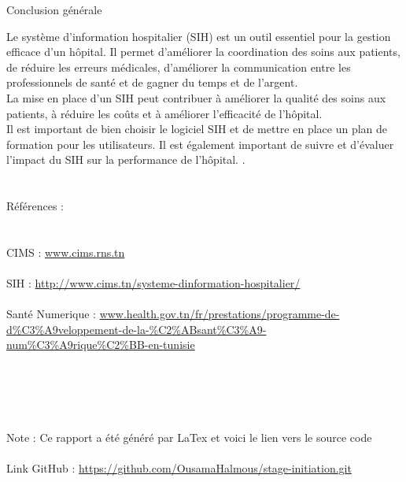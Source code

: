 \documentclass[12pt]{rapportINPTCLOUD}
\begin{document}
\begin{center}
	\Huge{Conclusion générale}
\end{center}
\large {
Le système d'information hospitalier (SIH) est un outil essentiel pour la gestion efficace d'un hôpital. Il permet d'améliorer la coordination des soins aux patients, de réduire les erreurs médicales, d'améliorer la communication entre les professionnels de santé et de gagner du temps et de l'argent.\\

La mise en place d'un SIH peut contribuer à améliorer la qualité des soins aux patients, à réduire les coûts et à améliorer l'efficacité de l'hôpital.\\

 Il est important de bien choisir le logiciel SIH et de mettre en place un plan de formation pour les utilisateurs. Il est également important de suivre et d'évaluer l'impact du SIH sur la performance de l'hôpital.}
\newpage
.\\ \\ \\
\huge{ Références :\\ \\ \\}
\normalsize{
CIMS : \url{www.cims.rns.tn}\\ \\
SIH : \url{http://www.cims.tn/systeme-dinformation-hospitalier/}\\ \\
Santé Numerique : \url{www.health.gov.tn/fr/prestations/programme-de-d%C3%A9veloppement-de-la-%C2%ABsant%C3%A9-num%C3%A9rique%C2%BB-en-tunisie}\\ \\ \\ \\ \\ \\ 
Note : Ce rapport a été généré par LaTex et voici le lien vers le source code \\ \\ 
Link GitHub : \url{https://github.com/OusamaHalmous/stage-initiation.git}
}
\end{document}
